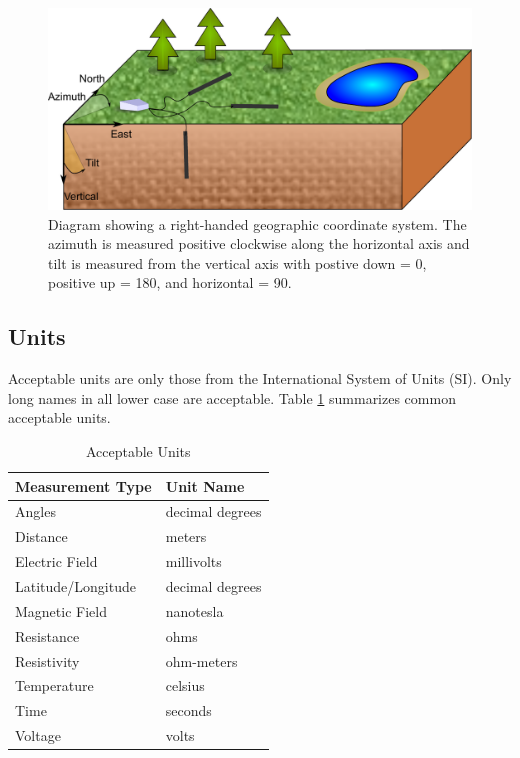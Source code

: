 \documentclass[12pt]{article}
\begin{document}
\begin{figure}[!h]
	\centering
	\includegraphics[width=.85\textwidth]{reference_frame.pdf}
	\caption{Diagram showing a right-handed geographic coordinate system.  The azimuth is measured positive clockwise along the horizontal axis and tilt is measured from the vertical axis with postive down = 0, positive up = 180, and horizontal = 90.}
	\label{fig:reference}
\end{figure}  

\subsection{Units}
Acceptable units are only those from the International System of Units (SI).  Only long names in all lower case are acceptable.  Table \ref{tab:units} summarizes common acceptable units.


\begin{table}[!h]
	\centering
	\caption[Acceptable Units]{Acceptable Units}
	\begin{tabular}{ll}
		\toprule
		\textbf{Measurement Type} & \textbf{Unit Name} \\ \midrule
		Angles & decimal degrees \\ \midrule
		
		Distance &  meters  \\ \midrule
		Electric Field & millivolts\\ \midrule
		Latitude/Longitude & decimal degrees \\ \midrule
		Magnetic Field & nanotesla \\ \midrule
		Resistance & ohms   \\ \midrule
		Resistivity & ohm-meters \\ \midrule
		Temperature & celsius\\ \midrule
		Time & seconds\\ \midrule
		Voltage & volts \\ \bottomrule
		
		
	\end{tabular}
	\label{tab:units}
\end{table}
\end{document}
